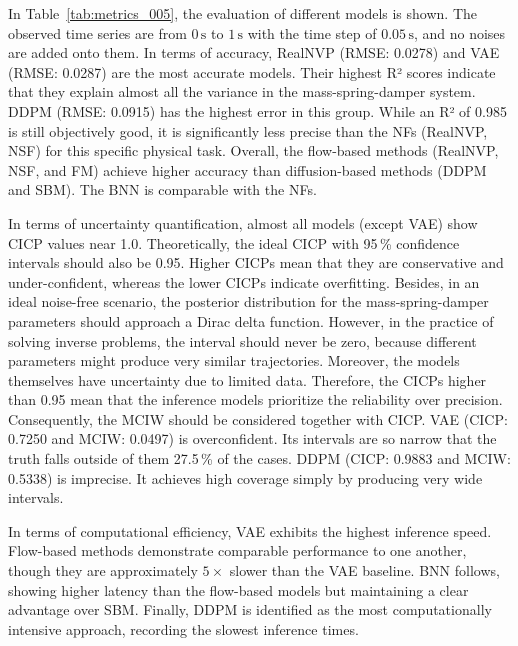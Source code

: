 In Table~\ref{tab:metrics_005}, the evaluation of different models is shown. The observed time series are from $0\,\mathrm{s}$ to $1\,\mathrm{s}$ with the time step of $0.05\,\mathrm{s}$, and no noises are added onto them. In terms of accuracy, \ac{RealNVP} (RMSE: 0.0278) and VAE (RMSE: 0.0287) are the most accurate models. Their highest R² scores indicate that they explain almost all the variance in the mass-spring-damper system. \ac{DDPM} (RMSE: 0.0915) has the highest error in this group. While an R² of 0.985 is still objectively good, it is significantly less precise than the \acp{NF} (\ac{RealNVP}, \ac{NSF}) for this specific physical task. Overall, the flow-based methods (\ac{RealNVP}, \ac{NSF}, and \ac{FM}) achieve higher accuracy than diffusion-based methods (\ac{DDPM} and \ac{SBM}). The \ac{BNN} is comparable with the \acp{NF}.

In terms of uncertainty quantification, almost all models (except VAE) show CICP values near 1.0. Theoretically, the ideal CICP with 95\,\% confidence intervals should also be 0.95. Higher CICPs mean that they are conservative and under-confident, whereas the lower CICPs indicate overfitting. Besides, in an ideal noise-free scenario, the posterior distribution for the mass-spring-damper parameters should approach a Dirac delta function. However, in the practice of solving inverse problems, the interval should never be zero, because different parameters might produce very similar trajectories. Moreover, the models themselves have uncertainty due to limited data. Therefore, the CICPs higher than 0.95 mean that the inference models prioritize the reliability over precision.  Consequently, the MCIW should be considered together with CICP. \ac{VAE} (CICP: 0.7250 and MCIW: 0.0497) is overconfident. Its intervals are so narrow that the truth falls outside of them 27.5\,\% of the cases. \ac{DDPM} (CICP: 0.9883 and MCIW: 0.5338) is imprecise. It achieves high coverage simply by producing very wide intervals. 

In terms of computational efficiency, \ac{VAE} exhibits the highest inference speed. Flow-based methods demonstrate comparable performance to one another, though they are approximately $5\times$ slower than the \ac{VAE} baseline. \ac{BNN} follows, showing higher latency than the flow-based models but maintaining a clear advantage over \ac{SBM}. Finally, \ac{DDPM} is identified as the most computationally intensive approach, recording the slowest inference times.

